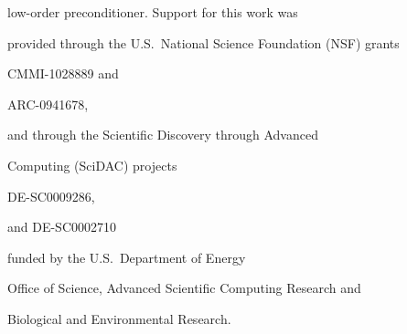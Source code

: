 \documentclass[smallcondensed,final]{svjour3}     %
\begin{document}
low-order preconditioner. Support for this work was

  provided through the U.S.~National Science Foundation (NSF) grants

  CMMI-1028889 and   %

  ARC-0941678,       %

 and through the Scientific Discovery through Advanced

  Computing (SciDAC) projects 

  DE-SC0009286,   %


  and DE-SC0002710 %

  funded by the U.S.~Department of Energy

  Office of Science, Advanced Scientific Computing Research and

  Biological and Environmental Research.








\end{document}
